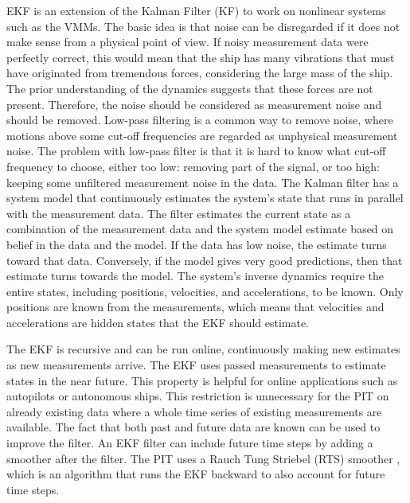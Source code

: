 EKF is an extension of the Kalman Filter (KF) to work on nonlinear systems such as the VMMs. The basic idea is that noise can be disregarded if it does not make sense from a physical point of view. If noisy measurement data were perfectly correct, this would mean that the ship has many vibrations that must have originated from tremendous forces, considering the large mass of the ship. The prior understanding of the dynamics suggests that these forces are not present. Therefore, the noise should be considered as measurement noise and should be removed. Low-pass filtering is a common way to remove noise, where motions above some cut-off frequencies are regarded as unphysical measurement noise. The problem with low-pass filter is that it is hard to know what cut-off frequency to choose, either too low: removing part of the signal, or too high: keeping some unfiltered measurement noise in the data. The Kalman filter has a system model that continuously estimates the system’s state that runs in parallel with the measurement data. The filter estimates the current state as a combination of the measurement data and the system model estimate based on belief in the data and the model. If the data has low noise, the estimate turns toward that data. Conversely, if the model gives very good predictions, then that estimate turns towards the model.
The system’s inverse dynamics require the entire states, including positions, velocities, and accelerations, to be known. Only positions are known from the measurements, which means that velocities and accelerations are hidden states that the EKF should estimate.

The EKF is recursive and can be run online, continuously making new estimates as new measurements arrive. The EKF uses passed measurements to estimate states in the near future. This property is helpful for online applications such as  autopilots or autonomous ships. This restriction is  unnecessary for the PIT on already existing data where a whole time series of existing measurements are available. The fact that both past and future data are known can be used to improve the filter. An EKF filter can include future time steps by adding a smoother after the filter. The PIT uses a Rauch Tung Striebel (RTS) smoother \cite{rauch_maximum_1965}, which is an algorithm that runs the EKF backward to also account for future time steps.


